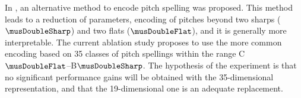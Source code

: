 
In , an alternative method
to encode pitch spelling was proposed. This method leads to
a reduction of parameters, encoding of pitches beyond two
sharps ($\musDoubleSharp$) and two flats ($\musDoubleFlat$),
and it is generally more interpretable. The current ablation
study proposes to use the more common encoding based on 35
classes of pitch spellings within the range
C$\musDoubleFlat$--B$\musDoubleSharp$. The hypothesis of the
experiment is that no significant performance gains will be
obtained with the 35-dimensional representation, and that
the 19-dimensional one is an adequate replacement.
